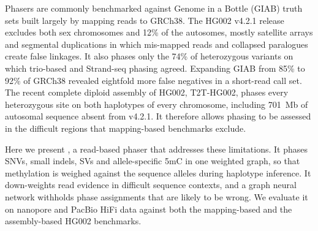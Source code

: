 Phasers are commonly benchmarked against Genome in a Bottle (GIAB) truth sets built largely by mapping reads to GRCh38\cite{zook2019giab,wagner2022giab}. The HG002 v4.2.1 release excludes both sex chromosomes and 12\% of the autosomes, mostly satellite arrays and segmental duplications in which mis-mapped reads and collapsed paralogues create false linkages\cite{wagner2022giab,hansen2026q100,olson2023benchmarking,dwarshuis2024stratifications}. It also phases only the 74\% of heterozygous variants on which trio-based and Strand-seq phasing agreed\cite{wagner2022giab}. Expanding GIAB from 85\% to 92\% of GRCh38 revealed eightfold more false negatives in a short-read call set\cite{wagner2022giab}. The recent complete diploid assembly of HG002, T2T-HG002, phases every heterozygous site on both haplotypes of every chromosome, including 701~Mb of autosomal sequence absent from v4.2.1\cite{hansen2026q100}. It therefore allows phasing to be assessed in the difficult regions that mapping-based benchmarks exclude.

Here we present \toolname, a read-based phaser that addresses these limitations. It phases SNVs, small indels, SVs and allele-specific 5mC in one weighted graph, so that methylation is weighed against the sequence alleles during haplotype inference. It down-weights read evidence in difficult sequence contexts, and a graph neural network withholds phase assignments that are likely to be wrong. We evaluate it on nanopore and PacBio HiFi data against both the mapping-based and the assembly-based HG002 benchmarks.

